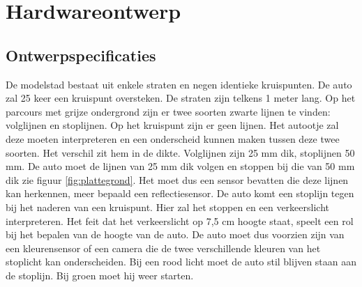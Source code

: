 \documentclass[a4paper,twoside,kulak]{kulakreport} %
\begin{document}
\section{Hardwareontwerp} \label{Hardwareontwerp}

\subsection{Ontwerpspecificaties} \label{Ontwerpspecificaties}


De modelstad bestaat uit enkele straten en negen identieke kruispunten. De auto zal 25 keer een kruispunt oversteken. De straten zijn telkens 1 meter lang. Op het parcours met grijze ondergrond zijn er twee soorten zwarte lijnen te vinden: volglijnen en stoplijnen. Op het kruispunt zijn er geen lijnen. Het autootje zal deze moeten interpreteren en een onderscheid kunnen maken tussen deze twee soorten. Het verschil zit hem in de dikte. Volglijnen zijn 25 mm dik, stoplijnen 50 mm. De auto moet de lijnen van 25 mm dik volgen en stoppen bij die van 50 mm dik zie figuur \ref{fig:plattegrond}. Het moet dus een sensor bevatten die deze lijnen kan herkennen, meer bepaald een reflectiesensor. De auto komt een stoplijn tegen bij het naderen van een kruispunt. Hier zal het stoppen en een verkeerslicht interpreteren. Het feit dat het verkeerslicht op 7,5 cm hoogte staat, speelt een rol bij het bepalen van de hoogte van de auto. De auto moet dus voorzien zijn van een kleurensensor of een camera die de twee verschillende kleuren van het stoplicht kan onderscheiden. Bij een rood licht moet de auto stil blijven staan aan de stoplijn. Bij groen moet hij weer starten. 
\end{document}

